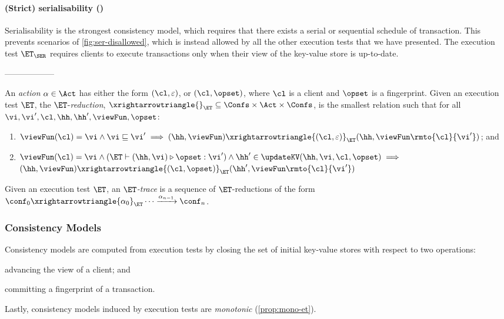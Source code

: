 \paragraph{(Strict) serialisability (\SER)}
Serialisability is the strongest consistency model, 
which requires that there exists a serial or sequential schedule of transaction. 
This prevents scenarios of \cref{fig:ser-disallowed},
which is instead allowed by all the other execution tests that we have presented.
The execution test $\ET_{\SER}$ requires 
clients to execute transactions only when their view of the key-value store is up-to-date.


------------------

\begin{definition}[$\ET$-reductions]
\label{def:reduction}
An \emph{action} $\alpha \in \Act$ has either the form $(\cl, \varepsilon)$, 
or $(\cl, \opset)$, 
where $\cl$ is a client and $\opset$ is a fingerprint. 
Given an execution test $\ET$, the $\ET$-\emph{reduction}, 
$\xrightarrowtriangle{}_{\ET} \subseteq \Confs \times \Act \times \Confs$, 
is the smallest relation such that for all $\vi, \vi', \cl, \hh, \hh', \viewFun, \opset$:
\begin{enumerate}
	\item 
    $
    \viewFun(\cl) = \vi 
    \wedge \vi \sqsubseteq \vi' 
    \implies (\hh, \viewFun) \xrightarrowtriangle{(\cl, \varepsilon)}_{\ET} 
    (\hh, \viewFun\rmto{\cl}{\vi'})$; and
	\item 
    $\viewFun(\cl) = \vi
        \wedge (\ET \vdash (\hh, \vi) \triangleright \opset: \vi')  
        \wedge \hh' \in \updateKV(\hh, \vi, \cl, \opset) \implies
	$  \\
	\phantom{a} \hfill 
	$(\hh, \viewFun) \xrightarrowtriangle{(\cl, \opset)}_{\ET} (\hh', \viewFun\rmto{\cl}{\vi'})$
\end{enumerate}
Given an execution test $\ET$, an \emph{$\ET$-trace} is a sequence of $\ET$-reductions of the form $\conf_{0} \xrightarrowtriangle{\alpha_{0}}_{\ET} \cdots 
\xrightarrow{\alpha_{n-1}} \conf_{n}$.
\end{definition}

\subsubsection{Consistency Models}
Consistency models are computed from execution tests by closing the set of initial key-value stores with respect to two operations: 
\begin{enumerate*}[label=(\arabic*)]
	\item advancing the view of a client; and 
	\item committing a fingerprint of a transaction. 
\end{enumerate*}
Lastly, consistency models induced by execution tests are \emph{monotonic} (\cref{prop:mono-et}).

